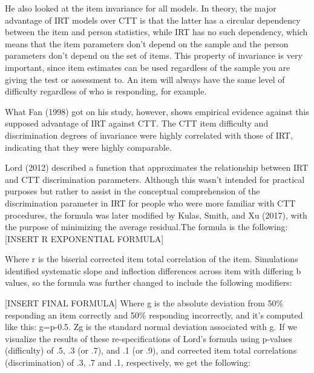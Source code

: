 \documentclass[
  english,
  man,floatsintext]{apa6}
\begin{document}
He also looked at the item invariance for all models. In theory, the major advantage of IRT models over CTT is that the latter has a circular dependency between the item and person statistics, while IRT has no such dependency, which means that the item parameters don't depend on the sample and the person parameters don't depend on the set of items. This property of invariance is very important, since item estimates can be used regardless of the sample you are giving the test or assessment to. An item will always have the same level of difficulty regardless of who is responding, for example.

What Fan (1998) got on his study, however, shows empirical evidence against this supposed advantage of IRT against CTT. The CTT item difficulty and discrimination degrees of invariance were highly correlated with those of IRT, indicating that they were highly comparable.

Lord (2012) described a function that approximates the relationship between IRT and CTT discrimination parameters. Although this wasn't intended for practical purposes but rather to assist in the conceptual comprehension of the discrimination parameter in IRT for people who were more familiar with CTT procedures, the formula was later modified by Kulas, Smith, and Xu (2017), with the purpose of minimizing the average residual.The formula is the following:
{[}INSERT R EXPONENTIAL FORMULA{]}

Where r is the biserial corrected item total correlation of the item. Simulations identified systematic slope and inflection differences across item with differing b values, so the formula was further changed to include the following modifiers:

{[}INSERT FINAL FORMULA{]}
Where g is the absolute deviation from 50\% responding an item correctly and 50\% responding incorrectly, and it's computed like this: g=\textbar p-0.5\textbar. Zg is the standard normal deviation associated with g. If we visualize the results of these re-specifications of Lord's formula using p-values (difficulty) of .5, .3 (or .7), and .1 (or .9), and corrected item total correlations (discrimination) of .3, .7 and .1, respectively, we get the following:
\end{document}
